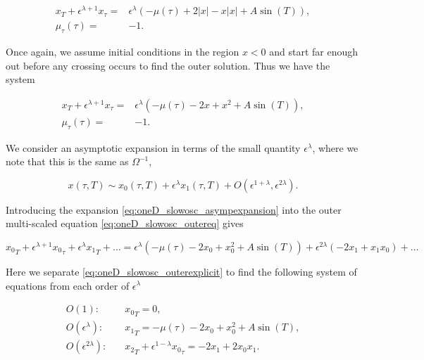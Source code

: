 \begin{equation*}
\begin{aligned}
x_T+\epsilon^{\lambda+1}x_\tau =& \epsilon^\lambda (-\mu(\tau)+2|x|-x|x|+A\sin(T)),\\
\mu_\tau(\tau)=&-1.
\end{aligned}
\end{equation*}

Once again, we assume initial conditions in the region $x<0$ and start far enough out before any crossing occurs to find the outer solution. Thus we have the system

\begin{equation}\label{eq:oneD_slowosc_outereq}
\begin{aligned}
x_T+\epsilon^{\lambda+1}x_\tau =& \epsilon^\lambda (-\mu(\tau)-2x+x^2+A\sin(T)),\\
\mu_\tau(\tau)=&-1.
\end{aligned}
\end{equation}

We consider an asymptotic expansion in terms of the small quantity $\epsilon^\lambda$, where we note that this is the same as $\Omega^{-1}$,

\begin{equation}\label{eq:oneD_slowosc_asympexpansion}
x(\tau,T)\sim x_0(\tau,T)+\epsilon^\lambda x_1(\tau,T)+O(\epsilon^{1+\lambda},\epsilon^{2\lambda}).
\end{equation}

Introducing the expansion \eqref{eq:oneD_slowosc_asympexpansion} into the outer multi-scaled equation \eqref{eq:oneD_slowosc_outereq} gives 

\begin{equation}\label{eq:oneD_slowosc_outerexplicit}
{x_0}_T+\epsilon^{\lambda+1}{x_0}_\tau+\epsilon^\lambda {x_1}_T+\ldots=\epsilon^\lambda(-\mu(\tau)-2x_0+x_0^2+A\sin(T))+\epsilon^{2\lambda}(-2x_1+x_1x_0)+\ldots
\end{equation}

Here we separate \eqref{eq:oneD_slowosc_outerexplicit} to find the following system of equations from each order of $\epsilon^\lambda$

\begin{align}
\label{eq:oneD_slowosc_outerO1}
O(1):\quad & {x_0}_T=0, \\
\label{eq:oneD_slowosc_outerO2}
O(\epsilon^\lambda):\quad& {x_1}_T=-\mu(\tau)-2x_0+x_0^2+A\sin(T),\\
\label{eq:oneD_slowosc_outerO3}
O(\epsilon^{2\lambda}):\quad& {x_2}_T+\epsilon^{1-\lambda}{x_0}_\tau= -2x_1+2x_0x_1.
\end{align}

